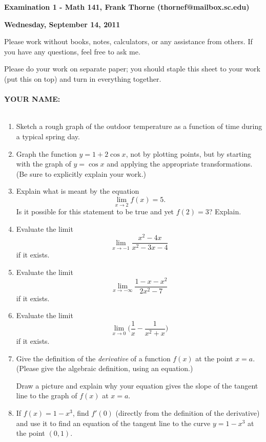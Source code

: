 \documentclass[12pt]{article}
\begin{document}
\setlength{\topmargin}{-0.6in}





\begin{center}{\bf Examination 1 - Math 141, Frank Thorne (thornef@mailbox.sc.edu)}
\end{center}
\begin{center}
{\bf Wednesday, September 14, 2011}
\end{center}

Please work without books, notes, calculators, or any assistance from others. If you have
any questions, feel free to ask me. 

Please do your work on separate paper; you should staple this sheet to your work (put this on top)
and turn in everything together. 
\\
\\
{\bf YOUR NAME: }
\\
\\
\begin{enumerate}[(1)]
\item
Sketch a rough graph of the outdoor temperature as a function of time during a
typical spring day.

\item
Graph the function $y = 1 + 2 \cos x$, not by plotting points, but by
starting with the graph of $y = \cos x$ and applying the appropriate transformations.
(Be sure to explicitly explain your work.)

\item
Explain what is meant by the equation
$$\lim_{x \rightarrow 2} f(x) = 5.$$
Is it possible for this statement to be true and yet $f(2) = 3$? Explain.

\item
Evaluate the limit
$$\lim_{x \rightarrow -1} \frac{x^2 - 4x}{x^2 - 3x - 4}$$
if it exists.

\item
Evaluate the limit
$$\lim_{x \rightarrow - \infty} \frac{1 - x - x^2}{2 x^2 - 7}$$
if it exists.

\item
Evaluate the limit
$$\lim_{x \rightarrow 0} \bigg( \frac{1}{x} - \frac{1}{x^2 + x}\bigg)$$
if it exists.

\item
Give the definition of the {\itshape derivative} of a function
$f(x)$ at the point $x = a$. (Please give the algebraic definition,
using an equation.)

Draw a picture and explain why your
equation gives the slope of the tangent line to the graph of $f(x)$
at $x = a$.

\item
If $f(x) = 1 - x^3$, find $f'(0)$ (directly from the definition 
of the derivative) and use it to find an equation of the tangent line
to the curve $y = 1 - x^3$ at the point $(0, 1)$.

\end{enumerate}
\end{document}
